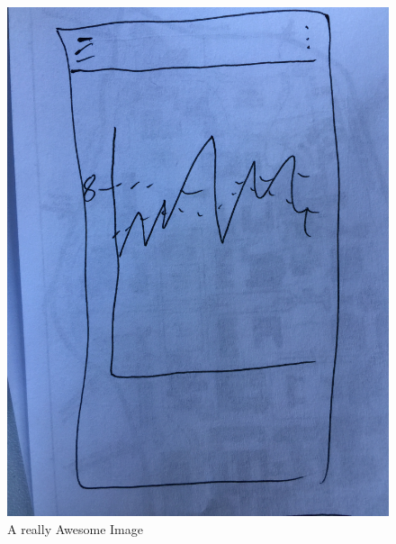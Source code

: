 \documentclass[twoside, letterpaper, american]{article}
\begin{document}
\begin{figure}[!htb]
  \includegraphics[width=\linewidth]{images/graph.JPG}
  \caption{A really Awesome Image}\label{fig:graph}
\endminipage\hfill
{}

\end{figure}
\end{document}
